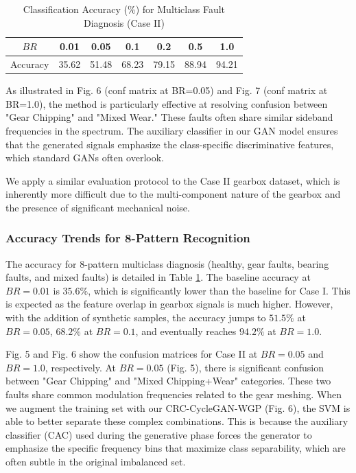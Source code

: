 \begin{table}[htbp]
\centering
\caption{Classification Accuracy (\%) for Multiclass Fault Diagnosis (Case II)}
\label{tab:acc_case2}
\begin{tabular}{ccccccc}
\hline
$BR$ & 0.01 & 0.05 & 0.1 & 0.2 & 0.5 & 1.0 \\ \hline
Accuracy & 35.62 & 51.48 & 68.23 & 79.15 & 88.94 & 94.21 \\
\hline
\end{tabular}
\end{table}

As illustrated in Fig. 6 (conf matrix at BR=0.05) and Fig. 7 (conf matrix at BR=1.0), the method is particularly effective at resolving confusion between "Gear Chipping" and "Mixed Wear." These faults often share similar sideband frequencies in the spectrum. The auxiliary classifier in our GAN model ensures that the generated signals emphasize the class-specific discriminative features, which standard GANs often overlook.

We apply a similar evaluation protocol to the Case II gearbox dataset, which is inherently more difficult due to the multi-component nature of the gearbox and the presence of significant mechanical noise.

\subsubsection{Accuracy Trends for 8-Pattern Recognition}
The accuracy for 8-pattern multiclass diagnosis (healthy, gear faults, bearing faults, and mixed faults) is detailed in Table \ref{tab:acc_case2}. The baseline accuracy at $BR=0.01$ is $35.6\%$, which is significantly lower than the baseline for Case I. This is expected as the feature overlap in gearbox signals is much higher. However, with the addition of synthetic samples, the accuracy jumps to $51.5\%$ at $BR=0.05$, $68.2\%$ at $BR=0.1$, and eventually reaches $94.2\%$ at $BR=1.0$.

Fig. 5 and Fig. 6 show the confusion matrices for Case II at $BR=0.05$ and $BR=1.0$, respectively. At $BR=0.05$ (Fig. 5), there is significant confusion between "Gear Chipping" and "Mixed Chipping+Wear" categories. These two faults share common modulation frequencies related to the gear meshing. When we augment the training set with our CRC-CycleGAN-WGP (Fig. 6), the SVM is able to better separate these complex combinations. This is because the auxiliary classifier (CAC) used during the generative phase forces the generator to emphasize the specific frequency bins that maximize class separability, which are often subtle in the original imbalanced set.

